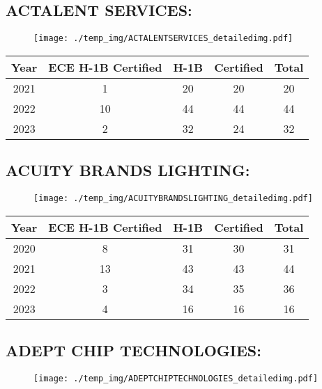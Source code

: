 \documentclass{article}%
\begin{document}
%
\newpage%
\subsection{ACTALENT SERVICES:}%
\label{subsec:ACTALENTSERVICES}%
\label{ACTALENTSERVICESdetailed}%


\begin{figure}[htbp]%
\centering%
\texttt{[image: ./temp\_img/ACTALENTSERVICES\_detailedimg.pdf]}%
\end{figure}

%
\begin{longtable}{c|c|c|c|c}%
\hline%
Year&ECE H{-}1B Certified&H{-}1B&Certified&Total\\%
\hline%
2021&1&20&20&20\\%
\hline%
2022&10&44&44&44\\%
\hline%
2023&2&32&24&32\\%
\hline%
\end{longtable}

%
\newpage%
\subsection{ACUITY BRANDS LIGHTING:}%
\label{subsec:ACUITYBRANDSLIGHTING}%
\label{ACUITYBRANDSLIGHTINGdetailed}%


\begin{figure}[htbp]%
\centering%
\texttt{[image: ./temp\_img/ACUITYBRANDSLIGHTING\_detailedimg.pdf]}%
\end{figure}

%
\begin{longtable}{c|c|c|c|c}%
\hline%
Year&ECE H{-}1B Certified&H{-}1B&Certified&Total\\%
\hline%
2020&8&31&30&31\\%
\hline%
2021&13&43&43&44\\%
\hline%
2022&3&34&35&36\\%
\hline%
2023&4&16&16&16\\%
\hline%
\end{longtable}

%
\newpage%
\subsection{ADEPT CHIP TECHNOLOGIES:}%
\label{subsec:ADEPTCHIPTECHNOLOGIES}%
\label{ADEPTCHIPTECHNOLOGIESdetailed}%


\begin{figure}[htbp]%
\centering%
\texttt{[image: ./temp\_img/ADEPTCHIPTECHNOLOGIES\_detailedimg.pdf]}%
\end{figure}
\end{document}
